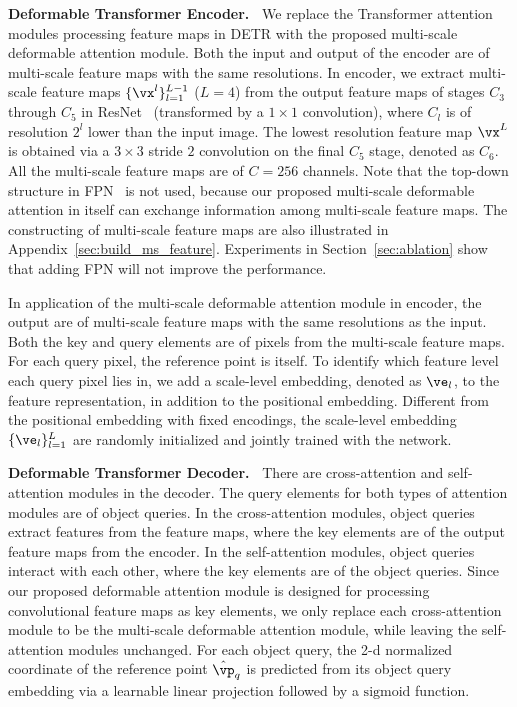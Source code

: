 \textbf{Deformable Transformer Encoder.~}
We replace the Transformer attention modules processing feature maps in DETR with the proposed multi-scale deformable attention module. Both the input and output of the encoder are of multi-scale feature maps with the same resolutions. In encoder, we extract multi-scale feature maps $\{\vx^l\}_{l=1}^{L-1}$ ($L = 4$) from the output feature maps of stages $C_3$ through $C_5$ in ResNet~\citep{he2016deep} (transformed by a $1\times 1$ convolution), where $C_l$ is of resolution $2^l$ lower than the input image. The lowest resolution feature map $\vx^L$ is obtained via a $3\times 3$ stride $2$ convolution on the final $C_5$ stage, denoted as $C_6$. All the multi-scale feature maps are of $C = 256$ channels. Note that the top-down structure in FPN~\citep{lin2017feature} is not used, because our proposed multi-scale deformable attention in itself can exchange information among multi-scale feature maps. The constructing of multi-scale feature maps are also illustrated in 
Appendix~\ref{sec:build_ms_feature}. Experiments in Section~\ref{sec:ablation} show that adding FPN will not improve the performance.

In application of the multi-scale deformable attention module in encoder, the output are of multi-scale feature maps with the same resolutions as the input. Both the key and query elements are of pixels from the multi-scale feature maps. For each query pixel, the reference point is itself.
To identify which feature level each query pixel lies in, we add a scale-level embedding, denoted as $\ve_l$, to the feature representation, in addition to the positional embedding. Different from the positional embedding with fixed encodings, the scale-level embedding $\{\ve_l\}_{l=1}^L$ are randomly initialized and jointly trained with the network. 

\textbf{Deformable Transformer Decoder.~} 
There are cross-attention and self-attention modules in the decoder.
The query elements for both types of attention modules are of object queries. 
In the cross-attention modules, object queries extract features from the feature maps, where the key elements are of the output feature maps from the encoder. In the self-attention modules, object queries interact with each other, where the key elements are of the object queries.
Since our proposed deformable attention module is designed for processing convolutional feature maps as key elements, we only replace each cross-attention module to be the multi-scale deformable attention module, while leaving the self-attention modules unchanged.
For each object query, the 2-d normalized coordinate of the reference point $\hat{\vp}_q$ is predicted from its object query embedding via a learnable linear projection followed by a $\mathrm{sigmoid}$ function.

